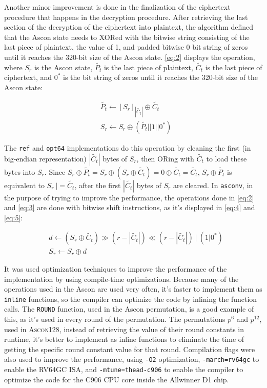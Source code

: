 \documentclass[11pt,twoside]{article}
\begin{document}
Another minor improvement is done in the finalization of the ciphertext procedure that happens in the decryption procedure. After retrieving the last section of the decryption of the ciphertext into plaintext, the algorithm defined that the Ascon state needs to XORed with the bitwise string consisting of the last piece of plaintext, the value of 1, and padded bitwise 0 bit string of zeros until it reaches the 320-bit size of the Ascon state. \cref{eq:2} displays the operation, where $S_r$ is the Ascon state, $\tilde{P_t}$ is the last piece of plaintext, $\tilde{C_t}$ is the last piece of ciphertext, and $0^*$ is the bit string of zeros until it reaches the 320-bit size of the Ascon state:

\begin{align}
   & \tilde{P_{t}} \leftarrow  {\left \lfloor S_{r}  \right \rfloor}_{\left| \tilde{C_{t}} \right|} \oplus \tilde{C_{t}} \label{eq:2} \\
   & S_r \leftarrow S_r \oplus (\tilde{P_{t}} || 1 || 0^{*}) \label{eq:3}
\end{align}

The \texttt{ref} and \texttt{opt64} implementations do this operation by cleaning the first (in big-endian representation) $| \tilde{C_{t}} |$ bytes of $S_r$, then ORing with $\tilde{C_t}$ to load these bytes into $S_r$. Since $S_r \oplus \tilde{P_t} = S_r \oplus  (S_r \oplus \tilde{C_t}) = 0 \oplus \tilde{C_t} = \tilde{C_t}$, $S_r \oplus \tilde{P_t}$ is equivalent to $S_{r} \ |= \tilde{C_t}$, after the first $| \tilde{C_{t}} |$ bytes of $S_r$ are cleared. In \texttt{asconv}, in the purpose of trying to improve the performance, the operations done in \cref{eq:2} and \cref{eq:3} are done with bitwise shift instructions, as it's displayed in \cref{eq:4} and \cref{eq:5}:

\begin{align}
   & d \leftarrow (S_r \oplus \tilde{C_{t}}) \gg (r - | \tilde{C_{t}}|) \ll (r - | \tilde{C_{t}} |) \ | \ (1|0^*) \label{eq:4} \\
   & S_r \leftarrow S_r \oplus d \label{eq:5}
\end{align}

It was used optimization techniques to improve the performance of the implementation by using compile-time optimizations. Because many of the operations used in the Ascon are used very often, it's faster to implement them as \texttt{inline} functions, so the compiler can optimize the code by inlining the function calls. The \texttt{ROUND} function, used in the Ascon permutation, is a good example of this, as it's used in every round of the permutation. The permutations $p^6$ and $p^{12}$, used in \textsc{Ascon128}, instead of retrieving the value of their round constants in runtime, it's better to implement as inline functions to eliminate the time of getting the specific round constant value for that round. Compilation flags were also used to improve the performance, using \texttt{-O2} optimization, \texttt{-march=rv64gc} to enable the RV64GC ISA, and \texttt{-mtune=thead-c906} to enable the compiler to optimize the code for the C906 CPU core inside the Allwinner D1 chip.
\end{document}
